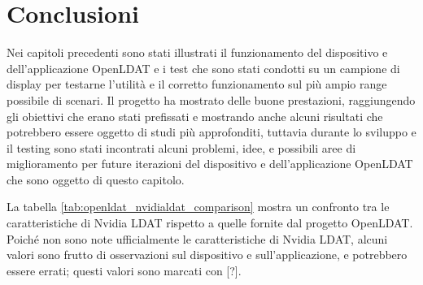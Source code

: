 \setlength{\parskip}{10pt}
\setlength{\parindent}{0pt}
\chapter{Conclusioni}
\label{chap:outro}

Nei capitoli precedenti sono stati illustrati il funzionamento del dispositivo e dell'applicazione OpenLDAT e i test che sono stati condotti su un campione di display per testarne l'utilità e il corretto funzionamento sul più ampio range possibile di scenari. Il progetto ha mostrato delle buone prestazioni, raggiungendo gli obiettivi che erano stati prefissati e mostrando anche alcuni risultati che potrebbero essere oggetto di studi più approfonditi, tuttavia durante lo sviluppo e il testing sono stati incontrati alcuni problemi, idee, e possibili aree di miglioramento per future iterazioni del dispositivo e dell'applicazione OpenLDAT che sono oggetto di questo capitolo.

La tabella \ref{tab:openldat_nvidialdat_comparison} mostra un confronto tra le caratteristiche di Nvidia LDAT rispetto a quelle fornite dal progetto OpenLDAT. Poiché non sono note ufficialmente le caratteristiche di Nvidia LDAT, alcuni valori sono frutto di osservazioni sul dispositivo e sull'applicazione, e potrebbero essere errati; questi valori sono marcati con [?].

